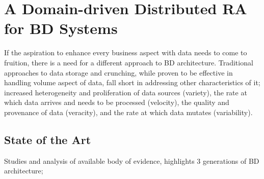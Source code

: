 \documentclass[runningheads]{llncs}
\begin{document}
\section{A Domain-driven Distributed RA for BD Systems}

If the aspiration to enhance every business aspect with data needs to come to fruition, there is a need for a different approach to BD architecture. Traditional approaches to data storage and crunching, while proven to be effective in handling volume aspect of data, fall short in addressing other characteristics of it; increased heterogeneity and proliferation of data sources (variety), the rate at which data arrives and needs to be processed (velocity), the quality and provenance of data (veracity), and the rate at which data mutates (variability).

\subsection{State of the Art}

 Studies and analysis of available body of evidence, highlights 3 generations of BD architecture; 
\end{document}

